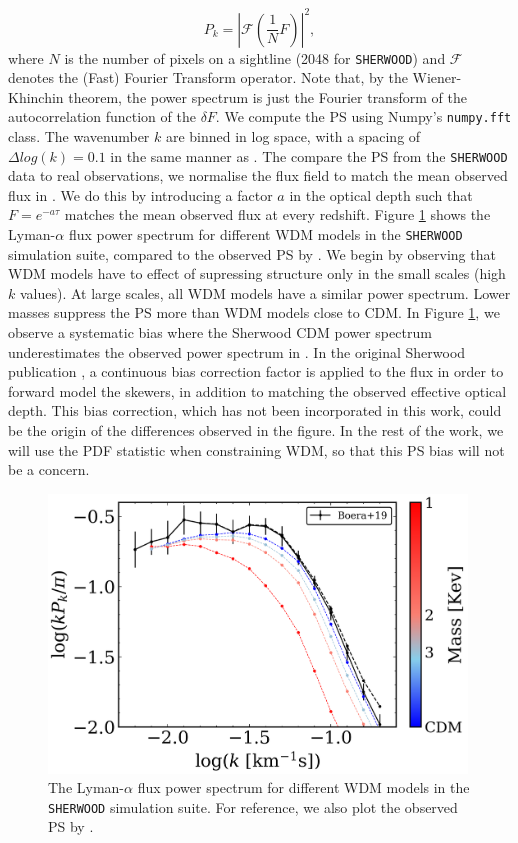 \begin{equation}\label{eq: PS def}
        P_k = \left| \mathcal{F}(\frac{1}{N} F)  \right| ^2,
\end{equation}
where $N$ is the number of pixels on a sightline (2048 for \texttt{SHERWOOD}) and $\mathcal{F}$ denotes the (Fast) Fourier Transform operator. Note that, by the Wiener-Khinchin theorem, the power spectrum is just the Fourier transform of the autocorrelation function of the $\delta F$. We compute the PS using Numpy's \texttt{numpy.fft} class. The wavenumber $k$ are binned in log space, with a spacing of $\Delta log(k)=0.1$ in the same manner as \cite{Boera_2019}. The compare the PS from the \texttt{SHERWOOD} data to real observations, we normalise the flux field to match the mean observed flux in \cite{Becker_mean_flux}. We do this by introducing a factor $a$ in the optical depth such that $F=e^{-a\tau}$ matches the mean observed flux at every redshift. Figure \ref{fig: sherwood exact PS} shows the Lyman-$\alpha$ flux power spectrum for different WDM models in the \texttt{SHERWOOD} simulation suite, compared to the observed PS by \cite{Boera_2019}. We begin by observing that WDM models have to effect of supressing structure only in the small scales (high $k$ values). At large scales, all WDM models have a similar power spectrum. Lower masses suppress the PS more than WDM models close to CDM.
In Figure \ref{fig: sherwood exact PS}, we observe a systematic bias where the Sherwood CDM power spectrum underestimates the observed power spectrum in \cite{Boera_2019}. In the original Sherwood publication \cite{Bolton_2016}, a continuous bias correction factor is applied to the flux in order to forward model the skewers, in addition to matching the observed effective optical depth. This bias correction, which has not been incorporated in this work, could be the origin of the differences observed in the figure. In the rest of the work, we will use the PDF statistic when constraining WDM, so that this PS bias will not be a concern.

\begin{figure}[h]
        \centering
        \includegraphics[width=0.99\textwidth]{img/ML/PS_sherwood.png}
        \caption{The Lyman-$\alpha$ flux power spectrum for different WDM models in the \texttt{SHERWOOD} simulation suite. For reference, we also plot the observed PS by \cite{Boera_2019}.}
        \label{fig: sherwood exact PS}     
\end{figure}


